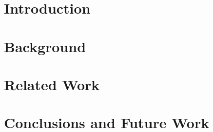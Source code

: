 


\setcounter{page}{1}


\setcounter{tocdepth}{1}
\tableofcontents

\pagebreak

{}
\listoftables

\pagebreak

{}
\listoffigures

\doublespace

\pagebreak

\setcounter{page}{1}


\pagebreak

\chapter{Introduction}
\label{ch:introduction}


\chapter{Background}
\label{ch:background}


\chapter{\mawapp}
\label{ch:maw_smda}


\chapter{\keggapp}
\label{ch:kegg}


\chapter{Related Work}
\label{ch:related_work}


\chapter{Conclusions and Future Work}
\label{ch:conclusion}



